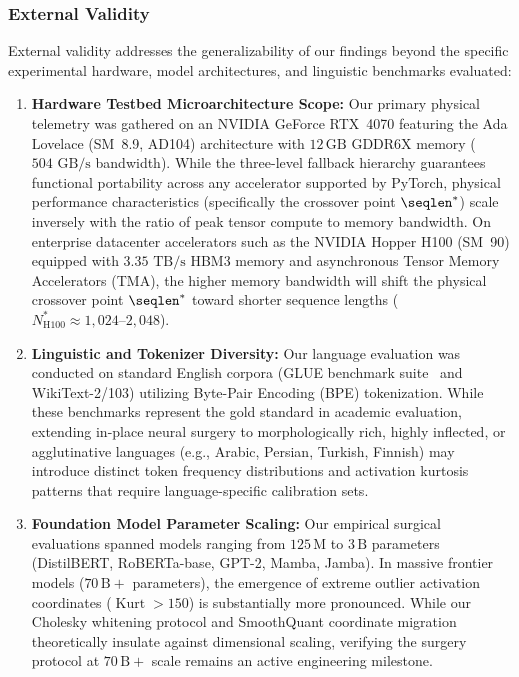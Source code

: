 \subsubsection{External Validity}
\label{subsubsec:external_validity}

External validity addresses the generalizability of our findings beyond the specific experimental hardware, model architectures, and linguistic benchmarks evaluated:
\begin{enumerate}
    \item \textbf{Hardware Testbed Microarchitecture Scope:}
    Our primary physical telemetry was gathered on an NVIDIA GeForce RTX~4070 featuring the Ada Lovelace (SM~8.9, AD104) architecture with $12\,\text{GB}$ GDDR6X memory ($504\text{ GB/s}$ bandwidth).
    While the three-level fallback hierarchy guarantees functional portability across any accelerator supported by PyTorch, physical performance characteristics (specifically the crossover point $\seqlen^*$) scale inversely with the ratio of peak tensor compute to memory bandwidth.
    On enterprise datacenter accelerators such as the NVIDIA Hopper H100 (SM~90) equipped with $3.35\text{ TB/s}$ HBM3 memory and asynchronous Tensor Memory Accelerators (TMA), the higher memory bandwidth will shift the physical crossover point $\seqlen^*$ toward shorter sequence lengths ($N^*_{\text{H100}} \approx 1{,}024\text{--}2{,}048$).
    \item \textbf{Linguistic and Tokenizer Diversity:}
    Our language evaluation was conducted on standard English corpora (GLUE benchmark suite~\cite{wang2018glue} and WikiText-2/103) utilizing Byte-Pair Encoding (BPE) tokenization.
    While these benchmarks represent the gold standard in academic evaluation, extending in-place neural surgery to morphologically rich, highly inflected, or agglutinative languages (e.g., Arabic, Persian, Turkish, Finnish) may introduce distinct token frequency distributions and activation kurtosis patterns that require language-specific calibration sets.
    \item \textbf{Foundation Model Parameter Scaling:}
    Our empirical surgical evaluations spanned models ranging from $125\,\text{M}$ to $3\,\text{B}$ parameters (DistilBERT, RoBERTa-base, GPT-2, Mamba, Jamba).
    In massive frontier models ($70\,\text{B}+$ parameters), the emergence of extreme outlier activation coordinates ($\operatorname{Kurt} > 150$) is substantially more pronounced.
    While our Cholesky whitening protocol and SmoothQuant coordinate migration theoretically insulate against dimensional scaling, verifying the surgery protocol at $70\,\text{B}+$ scale remains an active engineering milestone.
\end{enumerate}

